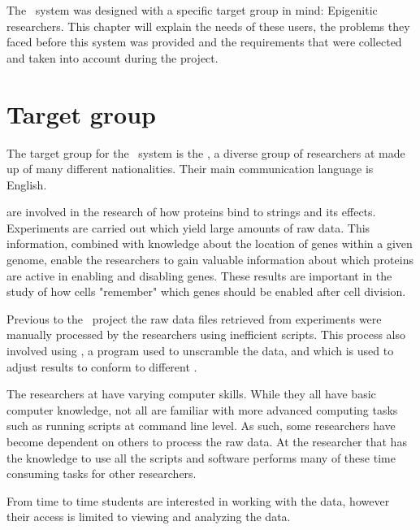 The \appName\ system was designed with a specific target group in mind: Epigenitic researchers. This chapter will explain the needs of these users, the problems they faced before this system was provided and the requirements that were collected and taken into account during the project.
\section{Target group}

The target group for the \appName\ system is  the , a diverse group of researchers at  made up of many different nationalities. Their main communication language is English.

 are involved in the research of how proteins bind to  strings and its effects. Experiments are carried out which yield large amounts of raw data. This information, combined with knowledge about the location of genes within a given genome, enable the researchers to gain valuable information about which proteins are active in enabling and disabling genes. These results are important in the study of how cells "remember" which genes should be enabled after cell division.

Previous to the \appName\ project the raw data files retrieved from experiments were manually processed by the researchers using inefficient  scripts. This process also involved using \cite{BOWTIE}, a program used to unscramble the  data, and \cite{LIFTOVER} which is used to adjust results to conform to different .

The researchers at  have varying computer skills. While they all have basic computer knowledge, not all are familiar with more advanced computing tasks such as running scripts at command line level. As such, some researchers have become dependent on others to process the raw data. At  the researcher that has the knowledge to use all the scripts and software performs many of these time consuming tasks for other researchers.

From time to time students are interested in working with the data, however their access is limited to viewing and analyzing the data. 


